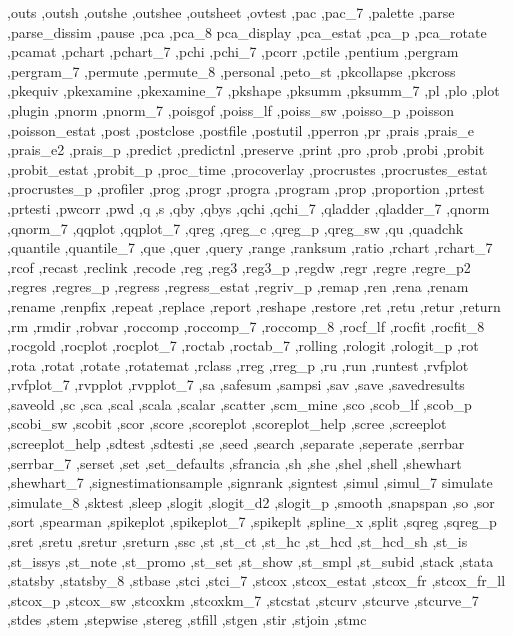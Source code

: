 {{    ,outs ,outsh ,outshe ,outshee ,outsheet ,ovtest ,pac ,pac_7 ,palette
    ,parse ,parse_dissim ,pause ,pca ,pca_8 pca_display ,pca_estat
    ,pca_p ,pca_rotate ,pcamat ,pchart ,pchart_7 ,pchi ,pchi_7 ,pcorr
    ,pctile ,pentium ,pergram ,pergram_7 ,permute ,permute_8 ,personal
    ,peto_st ,pkcollapse ,pkcross ,pkequiv ,pkexamine ,pkexamine_7
    ,pkshape ,pksumm ,pksumm_7 ,pl ,plo ,plot ,plugin ,pnorm ,pnorm_7
    ,poisgof ,poiss_lf ,poiss_sw ,poisso_p ,poisson ,poisson_estat
    ,post ,postclose ,postfile ,postutil ,pperron ,pr ,prais ,prais_e
    ,prais_e2 ,prais_p ,predict ,predictnl ,preserve ,print ,pro ,prob
    ,probi ,probit ,probit_estat ,probit_p ,proc_time ,procoverlay
    ,procrustes ,procrustes_estat ,procrustes_p ,profiler ,prog ,progr
    ,progra ,program ,prop ,proportion ,prtest ,prtesti ,pwcorr ,pwd
    ,q ,s ,qby ,qbys ,qchi ,qchi_7 ,qladder ,qladder_7 ,qnorm ,qnorm_7
    ,qqplot ,qqplot_7 ,qreg ,qreg_c ,qreg_p ,qreg_sw ,qu ,quadchk
    ,quantile ,quantile_7 ,que ,quer ,query ,range ,ranksum ,ratio
    ,rchart ,rchart_7 ,rcof ,recast ,reclink ,recode ,reg ,reg3
    ,reg3_p ,regdw ,regr ,regre ,regre_p2 ,regres ,regres_p ,regress
    ,regress_estat ,regriv_p ,remap ,ren ,rena ,renam ,rename ,renpfix
    ,repeat ,replace ,report ,reshape ,restore ,ret ,retu ,retur ,return
    ,rm ,rmdir ,robvar ,roccomp ,roccomp_7 ,roccomp_8 ,rocf_lf ,rocfit
    ,rocfit_8 ,rocgold ,rocplot ,rocplot_7 ,roctab ,roctab_7 ,rolling
    ,rologit ,rologit_p ,rot ,rota ,rotat ,rotate ,rotatemat ,rclass ,rreg
    ,rreg_p ,ru ,run ,runtest ,rvfplot ,rvfplot_7 ,rvpplot ,rvpplot_7
    ,sa ,safesum ,sampsi ,sav ,save ,savedresults ,saveold ,sc
    ,sca ,scal ,scala ,scalar ,scatter ,scm_mine ,sco ,scob_lf ,scob_p
    ,scobi_sw ,scobit ,scor ,score ,scoreplot ,scoreplot_help ,scree
    ,screeplot ,screeplot_help ,sdtest ,sdtesti ,se ,seed ,search ,separate
    ,seperate ,serrbar ,serrbar_7 ,serset ,set ,set_defaults ,sfrancia
    ,sh ,she ,shel ,shell ,shewhart ,shewhart_7 ,signestimationsample
    ,signrank ,signtest ,simul ,simul_7 simulate ,simulate_8 ,sktest
    ,sleep ,slogit ,slogit_d2 ,slogit_p ,smooth ,snapspan ,so ,sor
    ,sort ,spearman ,spikeplot ,spikeplot_7 ,spikeplt ,spline_x ,split
    ,sqreg ,sqreg_p ,sret ,sretu ,sretur ,sreturn ,ssc ,st ,st_ct ,st_hc
    ,st_hcd ,st_hcd_sh ,st_is ,st_issys ,st_note ,st_promo ,st_set
    ,st_show ,st_smpl ,st_subid ,stack ,stata ,statsby ,statsby_8 ,stbase
    ,stci ,stci_7 ,stcox ,stcox_estat ,stcox_fr ,stcox_fr_ll ,stcox_p
    ,stcox_sw ,stcoxkm ,stcoxkm_7 ,stcstat ,stcurv ,stcurve ,stcurve_7
    ,stdes ,stem ,stepwise ,stereg ,stfill ,stgen ,stir ,stjoin ,stmc
}}
